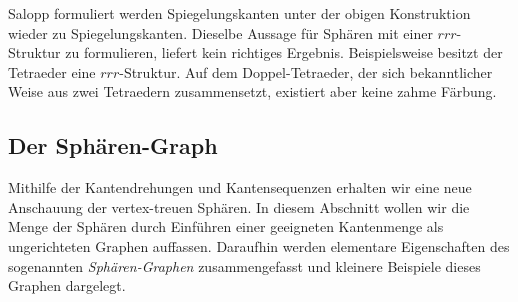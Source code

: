 \documentclass[12pt,titlepage,twoside,cleardoublepage]{article}
\theoremstyle{nummermitklammern}
\numberwithin{equation}{section}
\begin{document}
Salopp formuliert werden Spiegelungskanten unter der obigen Konstruktion wieder zu Spiegelungskanten.
Dieselbe Aussage für Sphären mit einer $rrr$-Struktur zu formulieren, liefert kein richtiges Ergebnis. Beispielsweise besitzt der Tetraeder eine $rrr$-Struktur. Auf dem Doppel-Tetraeder, der sich bekanntlicher Weise aus zwei Tetraedern zusammensetzt, existiert aber keine zahme Färbung.
\subsection{Der Sphären-Graph}
Mithilfe der Kantendrehungen und Kantensequenzen erhalten wir eine neue Anschauung der vertex-treuen Sphären. In diesem Abschnitt wollen wir die Menge der Sphären durch Einführen einer geeigneten Kantenmenge als ungerichteten Graphen auffassen. Daraufhin werden elementare Eigenschaften des sogenannten \emph{Sphären-Graphen} zusammengefasst und kleinere Beispiele dieses Graphen dargelegt. 
\end{document}
